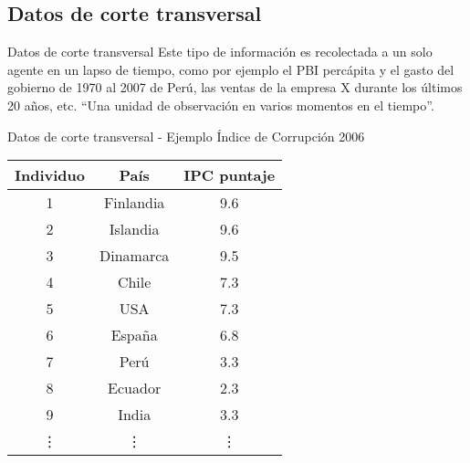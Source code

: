 \subsection{Datos de corte transversal}
\begin{frame}{Datos de corte transversal}
	Este tipo de información es recolectada a un solo agente en un lapso de tiempo, como por ejemplo el PBI percápita y el gasto del gobierno de 1970 al 2007 de Perú, las ventas de la empresa X durante los últimos 20 años, etc. ``Una unidad de observación en varios momentos en el tiempo''.
\end{frame}
\begin{frame}{Datos de corte transversal - Ejemplo}
	\centering
	{\small Índice de Corrupción 2006} \\
	\smallskip
	\begin{tabular}{ ccc } 
		\hline
		Individuo & País & IPC puntaje \\
		\hline\hline
		1 & Finlandia & 9.6 \\
		2 & Islandia  & 9.6 \\
		3 & Dinamarca & 9.5 \\
		4 & Chile	  & 7.3 \\
		5 & USA		  & 7.3 \\
		6 & España	  & 6.8 \\
		7 & Perú	  & 3.3 \\
		8 & Ecuador	  & 2.3 \\
		9 & India	  & 3.3 \\
		\vdots & \vdots & \vdots \\
		\hline
	\end{tabular}
\end{frame}

